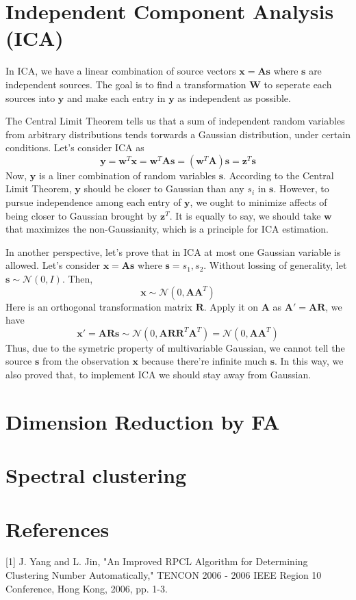 \documentclass{article}
\begin{document}
\section{Independent Component Analysis (ICA)}
\par
In ICA, we have a linear combination of source vectors $\mathbf{x}=\mathbf{As}$ where $\mathbf{s}$ are independent sources. The goal is to find a transformation $\mathbf{W}$ to seperate each sources into $\mathbf{y}$ and make each entry in $\mathbf{y}$ as independent as possible.
\par
The Central Limit Theorem tells us that a sum of independent random variables from arbitrary distributions tends torwards a Gaussian distribution, under certain conditions.
Let's consider ICA as
\begin{equation}
  \mathbf{y}=\mathbf{w}^T\mathbf{x}=\mathbf{w}^T\mathbf{As}=(\mathbf{w}^T\mathbf{A})\mathbf{s}=\mathbf{z}^T\mathbf{s}
\end{equation}
Now, $\mathbf{y}$ is a liner combination of random variables $\mathbf{s}$. According to the Central Limit Theorem, $\mathbf{y}$ should be closer to Gaussian than any $s_i$ in $\mathbf{s}$. However, to pursue independence among each entry of $\mathbf{y}$,
we ought to minimize affects of being closer to Gaussian brought by $\mathbf{z}^T$. It is equally to say, we should take $\mathbf{w}$ that maximizes the non-Gaussianity, which is a principle for ICA estimation.
\par
In another perspective, let's prove that in ICA at most one Gaussian variable is allowed. Let's consider $\mathbf{x}=\mathbf{As}$ where $\mathbf{s}={s_1,s_2}$. Without lossing of generality, let $\mathbf{s}\sim\mathcal{N}(0, I)$. Then, 
\begin{equation}
  \mathbf{x}\sim\mathcal{N}(0, \mathbf{AA}^T)
\end{equation}
Here is an orthogonal transformation matrix $\mathbf{R}$. Apply it on $\mathbf{A}$ as $\mathbf{A'}=\mathbf{AR}$, we have
\begin{equation}
  \mathbf{x'}=\mathbf{ARs}\sim\mathcal{N}(0, \mathbf{AR}\mathbf{R}^T\mathbf{A}^T)=\mathcal{N}(0, \mathbf{AA}^T)
\end{equation}
Thus, due to the symetric property of multivariable Gaussian, we cannot tell the source $\mathbf{s}$ from the observation $\mathbf{x}$ because there're infinite much $\mathbf{s}$. In this way, we also proved that, to implement ICA we should stay away from Gaussian.
\section{Dimension Reduction by FA}

\section{Spectral clustering}

\section*{References}
\small
[1] J. Yang and L. Jin, "An Improved RPCL Algorithm for Determining Clustering Number Automatically," TENCON 2006 - 2006 IEEE Region 10 Conference, Hong Kong, 2006, pp. 1-3.
\end{document}
